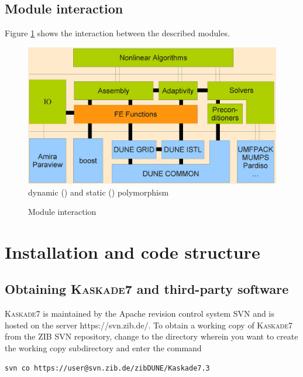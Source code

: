 \documentclass[11pt]{article}
\newcommand{\K}{\textsc{Kaskade7 }}
\begin{document}
\subsection{Module interaction}
Figure \ref{fig:modules} shows the interaction between the described modules.

\begin{figure}[!ht]
  \centering
  \includegraphics[scale=0.36]{kaskade7-2012-diagramm.eps}\\
  \vspace{-1mm}
   dynamic (\raisebox{0.7mm}{$\underline{\overline{\rule{0.6cm}{0pt}}}$}) and static  (\raisebox{0.2mm}{\rule{0.6cm}{0.1cm}}) polymorphism
  \caption{ Module interaction } \label{fig:modules}
\end{figure}


\section{Installation and code structure}\label{Install}

\subsection{Obtaining \K and third-party software}
\K is maintained by the Apache revision control system SVN and is hosted on the server {https://svn.zib.de/}.  
To obtain a working copy of \K from the ZIB SVN repository, change to the directory wherein you want to create 
the working copy subdirectory and enter the command 

\begin{scriptsize} 
\begin{verbatim} 
svn co https://user@svn.zib.de/zibDUNE/Kaskade7.3
\end{verbatim} 
\end{scriptsize} 
\end{document}

